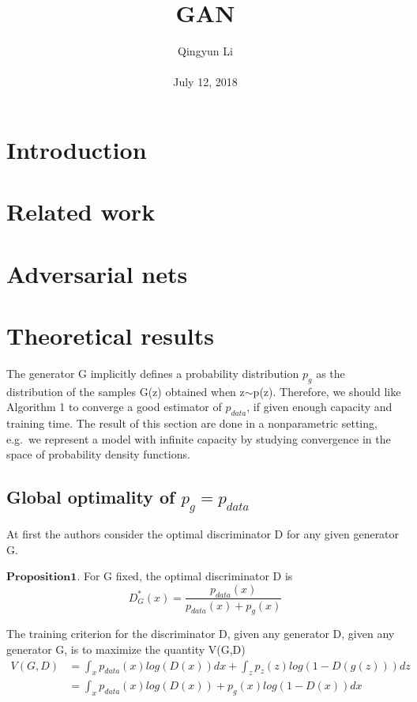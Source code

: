 \documentclass[10pt,twocolumn,letterpaper]{article}
\begin{document}
\author{Qingyun Li\\\\
July 12, 2018}        
\title{GAN}

\maketitle

\section{Introduction}
\section{Related work}
\section{Adversarial nets}
\section{Theoretical results}
\par The generator G implicitly defines a probability distribution $p_{g}$ as the distribution of the samples G(z) obtained when z$\sim$p(z). Therefore, we should like Algorithm 1 to converge a good estimator of $p_{data}$, if given enough capacity and training time. The result of this section are done in a nonparametric setting, e.g.\ we represent a model with infinite capacity by studying convergence in the space of probability density functions.
\subsection{Global optimality of $p_{g}=p_{data}$}
\par At first the authors consider the optimal discriminator D for any given generator G.
\par $\mathbf{Proposition 1.}$ For G fixed, the optimal discriminator D is
\begin{equation}
D_{G}^{*}(x)=\frac{p_{data}(x)}{p_{data}(x)+p_{g}(x)}
\end{equation}
\par The training criterion for the discriminator D, given any generator D, given any generator G, is to maximize the quantity V(G,D)
\begin{equation}
\begin{split}
V(G,D)&=\int_{x}p_{data}(x)log(D(x))dx
+\int_{z}p_{z}(z)log(1-D(g(z)))dz\\
&=\int_{x}p_{data}(x)log(D(x))
+p_{g}(x)log(1-D(x))dx
\end{split}
\end{equation}
  
 
\end{document}
